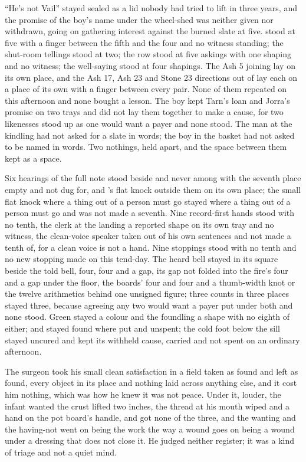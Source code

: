 \scenebreak

“He's not Vail” stayed sealed as a lid nobody had tried to lift in three years, and the promise of the boy's name under the wheel-shed was neither given nor withdrawn, going on gathering interest against the burned slate at five.  stood at five with a finger between the fifth and the four and no witness standing; the shut-room tellings stood at two; the row stood at five askings with one shaping and no witness; the well-saying stood at four shapings. The Ash 5 joining lay on its own place, and the Ash 17, Ash 23 and Stone 23 directions out of  lay each on a place of its own with a finger between every pair. None of them repeated on this afternoon and none bought a lesson. The boy kept Tarn's loan and Jorra's promise on two trays and did not lay them together to make a cause, for two likenesses stood up as one would want a payer and none stood. The man at the kindling had not asked for a slate in words; the boy in the basket had not asked to be named in words. Two nothings, held apart, and the space between them kept as a space.

Six hearings of the full note stood beside and never among with the seventh place empty and not dug for, and 's flat knock outside them on its own place; the small flat knock where a thing out of a person must go stayed where a thing out of a person must go and was not made a seventh. Nine record-first hands stood with no tenth, the clerk at the landing a reported shape on its own tray and no witness, the clean-voice speaker taken out of his own sentences and not made a tenth of, for a clean voice is not a hand. Nine stoppings stood with no tenth and no new stopping made on this tend-day. The heard bell stayed in its square beside the told bell, four, four and a gap, its gap not folded into the fire's four and a gap under the floor, the boards' four and four and a thumb-width knot or the twelve arithmetics behind one unsigned figure; three counts in three places stayed three, because agreeing any two would want a payer put under both and none stood. Green stayed a colour and the foundling a shape with no eighth of either;  and  stayed found where put and unspent; the cold foot below the sill stayed uncured and  kept its withheld cause, carried and not spent on an ordinary afternoon.

The surgeon took his small clean satisfaction in a field taken as found and left as found, every object in its place and nothing laid across anything else, and it cost him nothing, which was how he knew it was not peace. Under it, louder, the infant wanted the crust lifted two inches, the thread at his mouth wiped and a hand on the pot board's handle, and got none of the three, and the wanting and the having-not went on being the work the way a wound goes on being a wound under a dressing that does not close it. He judged neither register; it was a kind of triage and not a quiet mind.

